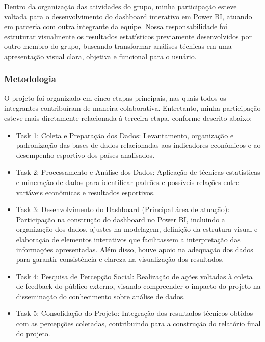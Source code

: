 \documentclass[12pt, a4paper, brazil]{article}
\begin{document}
Dentro da organização das atividades do grupo, minha participação esteve voltada para o desenvolvimento do dashboard interativo em Power BI, atuando em parceria com outra integrante da equipe. Nossa responsabilidade foi estruturar visualmente os resultados estatísticos previamente desenvolvidos por outro membro do grupo, buscando transformar análises técnicas em uma apresentação visual clara, objetiva e funcional para o usuário.

\subsubsection{Metodologia}
O projeto foi organizado em cinco etapas principais, nas quais todos os integrantes contribuíram de maneira colaborativa. Entretanto, minha participação esteve mais diretamente relacionada à terceira etapa, conforme descrito abaixo: 
\begin{itemize}
\item Task 1: Coleta e Preparação dos Dados: Levantamento, organização e padronização das bases de dados relacionadas aos indicadores econômicos e ao desempenho esportivo dos países analisados. 

\item Task 2: Processamento e Análise dos Dados: Aplicação de técnicas estatísticas e mineração de dados para identificar padrões e possíveis relações entre variáveis econômicas e resultados esportivos. 

\item Task 3: Desenvolvimento do Dashboard (Principal área de atuação): Participação na construção do dashboard no Power BI, incluindo a organização dos dados, ajustes na modelagem, definição da estrutura visual e elaboração de elementos interativos que facilitassem a interpretação das informações apresentadas. Além disso, houve apoio na adequação dos dados para garantir consistência e clareza na visualização dos resultados. 

\item Task 4: Pesquisa de Percepção Social: Realização de ações voltadas à coleta de feedback do público externo, visando compreender o impacto do projeto na disseminação do conhecimento sobre análise de dados. 

\item Task 5: Consolidação do Projeto: Integração dos resultados técnicos obtidos com as percepções coletadas, contribuindo para a construção do relatório final do projeto.
\end{itemize}
\end{document}
